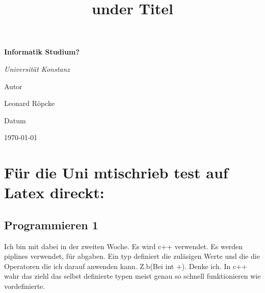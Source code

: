 \documentclass{article}
\title{under Titel}
\newcommand{\AuthorName}{Leonard Röpcke}
\newcommand{\Institute}{}
\newcommand{\header}{Informatik Studium?}
\newcommand{\Subtitle}{Universität Konstanz}
\newcommand{\MyDate}{\today}
\begin{document}
\begin{titlepage}
  \centering
  {\scshape\LARGE \Institute \par}
  \vspace{2.5cm}
  {\huge\bfseries \header \par}
  \vspace{0.8cm}
  {\Large\itshape \Subtitle \par}
  \vfill
  {\Large Autor\par}
  {\Large \AuthorName \par}
  \vspace{1cm}
  {\Large Datum\par}
  {\Large \MyDate \par}
  \vfill
  \vspace{1cm}
  {\small }
\end{titlepage}
\section*{Für die Uni mtischrieb test auf Latex direckt:}
\subsection{Programmieren 1}
Ich bin mit dabei in der zweiten Woche. Es wird c++ verwendet. Es werden piplines verwendet, für abgaben.
Ein typ definiert die zuläsigen Werte und die die Operatoren die ich darauf anwenden kann. Z.b(Bei int +). Denke ich.
In c++ wahr das ziehl das selbst definierte typen meist genau so schnell funktionieren wie vordefinierte.
\end{document}
